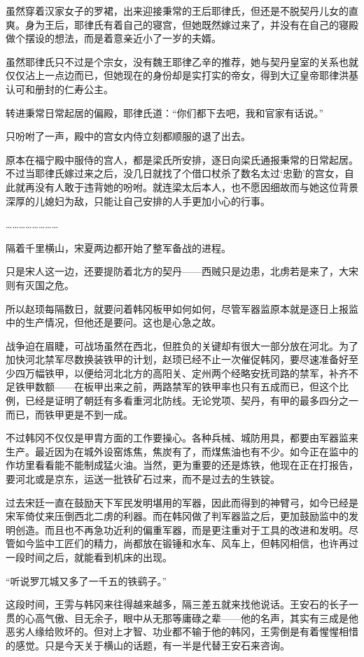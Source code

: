 虽然穿着汉家女子的罗裙，出来迎接秉常的王后耶律氏，但还是不脱契丹儿女的直爽。身为王后，耶律氏有着自己的寝宫，但她既然嫁过来了，并没有在自己的寝殿做个摆设的想法，而是着意亲近小了一岁的夫婿。

虽然耶律氏只不过是个宗女，没有魏王耶律乙辛的推荐，她与契丹皇室的关系也就仅仅沾上一点边而已，但她现在的身份却是实打实的帝女，得到大辽皇帝耶律洪基认可和册封的仁寿公主。

转进秉常日常起居的偏殿，耶律氏道：“你们都下去吧，我和官家有话说。”

只吩咐了一声，殿中的宫女内侍立刻都顺服的退了出去。

原本在福宁殿中服侍的宫人，都是梁氏所安排，逐日向梁氏通报秉常的日常起居。不过当耶律氏嫁过来之后，没几日就找了个借口杖杀了数名太过‘忠勤’的宫女，自此就再没有人敢于违背她的吩咐。就连梁太后本人，也不愿因细故而与她这位背景深厚的儿媳妇为敌，只能让自己安排的人手更加小心的行事。

……………………

隔着千里横山，宋夏两边都开始了整军备战的进程。

只是宋人这一边，还要提防着北方的契丹——西贼只是边患，北虏若是来了，大宋则有灭国之危。

所以赵顼每隔数日，就要问着韩冈板甲如何如何，尽管军器监原本就是逐日上报监中的生产情况，但他还是要问。这也是心急之故。

战争迫在眉睫，可战场虽然在西北，但胜负的关键却有很大一部分放在河北。为了加快河北禁军尽数换装铁甲的计划，赵顼已经不止一次催促韩冈，要尽速准备好至少四万幅铁甲，以便给河北北方的高阳关、定州两个经略安抚司路的禁军，补齐不足铁甲数额——在板甲出来之前，两路禁军的铁甲率也只有五成而已，但这个比例，已经是证明了朝廷有多看重河北防线。无论党项、契丹，有甲的最多四分之一而已，而铁甲更是不到一成。

不过韩冈不仅仅是甲胄方面的工作要操心。各种兵械、城防用具，都要由军器监来生产。最近因为在城外设窑炼焦，焦炭有了，而煤焦油也有不少。如今正在监中的作坊里看看能不能制成猛火油。当然，更为重要的还是炼铁，他现在正在打报告，要河北或是京东，运送一批铁矿石过来，而不是过去的生铁锭。

过去宋廷一直在鼓励天下军民发明堪用的军器，因此而得到的神臂弓，如今已经是宋军倚仗来压倒西北二虏的利器。而在韩冈做了判军器监之后，更加鼓励监中的发明创造。而且也不再急功近利的偏重军器，而是更注重对于工具的改进和发明。尽管如今监中工匠们的精力，尚都放在锻锤和水车、风车上，但韩冈相信，也许再过一段时间之后，就能看到机床的出现。

“听说罗兀城又多了一千五的铁鹞子。”

这段时间，王雱与韩冈来往得越来越多，隔三差五就来找他说话。王安石的长子一贯的心高气傲、目无余子，眼中从无那等庸碌之辈——他的名声，其实有三成是他恶劣人缘给败坏的。但对上才智、功业都不输于他的韩冈，王雱倒是有着惺惺相惜的感觉。只是今天关于横山的话题，有一半是代替王安石来咨询。

